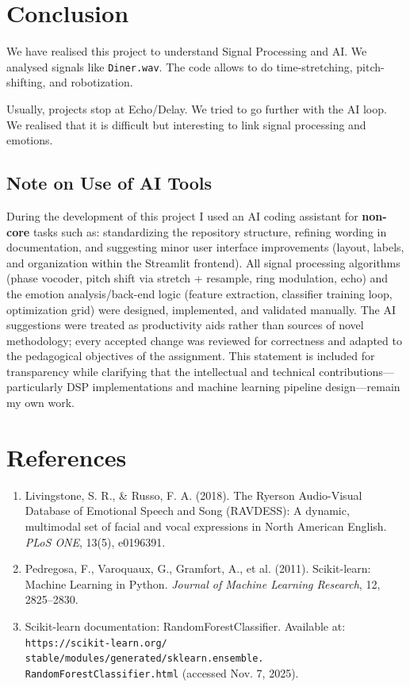 \documentclass[12pt,letterpaper]{article}
\begin{document}
\section{Conclusion}
We have realised this project to understand Signal Processing and AI. We analysed signals like \texttt{Diner.wav}. The code allows to do time-stretching, pitch-shifting, and robotization.

Usually, projects stop at Echo/Delay. We tried to go further with the AI loop. We realised that it is difficult but interesting to link signal processing and emotions.

\subsection*{Note on Use of AI Tools}
During the development of this project I used an AI coding assistant for \textbf{non-core} tasks such as: standardizing the repository structure, refining wording in documentation, and suggesting minor user interface improvements (layout, labels, and organization within the Streamlit frontend). All signal processing algorithms (phase vocoder, pitch shift via stretch + resample, ring modulation, echo) and the emotion analysis/back-end logic (feature extraction, classifier training loop, optimization grid) were designed, implemented, and validated manually. The AI suggestions were treated as productivity aids rather than sources of novel methodology; every accepted change was reviewed for correctness and adapted to the pedagogical objectives of the assignment. This statement is included for transparency while clarifying that the intellectual and technical contributions—particularly DSP implementations and machine learning pipeline design—remain my own work.

\section{References}
\begin{enumerate}
    \item Livingstone, S. R., \& Russo, F. A. (2018). The Ryerson Audio-Visual Database of Emotional Speech and Song (RAVDESS): A dynamic, multimodal set of facial and vocal expressions in North American English. \textit{PLoS ONE}, 13(5), e0196391.
    \item Pedregosa, F., Varoquaux, G., Gramfort, A., et al. (2011). Scikit-learn: Machine Learning in Python. \textit{Journal of Machine Learning Research}, 12, 2825--2830.
    \item Scikit-learn documentation: RandomForestClassifier. Available at: \texttt{https://scikit-learn.org/} \texttt{stable/modules/generated/sklearn.ensemble.} \texttt{RandomForestClassifier.html} (accessed Nov. 7, 2025).
\end{enumerate}
\end{document}
